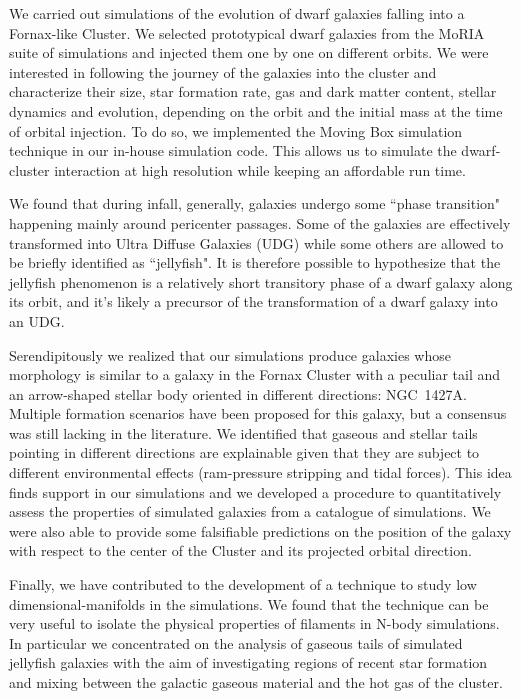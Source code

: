 We carried out simulations of the evolution of dwarf galaxies falling into a Fornax-like Cluster.
We selected prototypical dwarf galaxies from the MoRIA suite of simulations and injected them one by one on different orbits.
We were interested in following the journey of the galaxies into the cluster and characterize their size, star formation rate, gas and dark matter content, stellar dynamics and evolution, depending on the orbit and the initial mass at the time of orbital injection.
To do so, we implemented the Moving Box simulation technique in our in-house simulation code.
This allows us to simulate the dwarf-cluster interaction at high resolution while keeping an affordable run time.

We found that during infall, generally, galaxies undergo some ``phase transition" happening mainly around pericenter passages.
Some of the galaxies are effectively transformed into Ultra Diffuse Galaxies (UDG) while some others are allowed to be briefly identified as ``jellyfish".
It is therefore possible to hypothesize that the jellyfish phenomenon is a relatively short transitory phase of a dwarf galaxy along its orbit, and it's likely a precursor of the transformation of a dwarf galaxy into an UDG.

Serendipitously we realized that our simulations produce galaxies whose morphology is similar to a galaxy in the Fornax Cluster with a peculiar  \Hi{} tail and an arrow-shaped stellar body oriented in different directions: NGC~1427A.
Multiple formation scenarios have been proposed for this galaxy, but a consensus was still lacking in the literature.
We identified that gaseous and stellar tails pointing in different directions are explainable given that they are subject to different environmental effects (ram-pressure stripping and tidal forces). This idea finds support in our simulations and we developed a procedure to quantitatively assess the properties of simulated galaxies from a catalogue of simulations.
We were also able to provide some falsifiable predictions on the position of the galaxy with respect to the center of the Cluster and its projected orbital direction.

Finally, we have contributed to the development of a technique to study low dimensional-manifolds in the simulations.
We found that the technique can be very useful to isolate the physical properties of filaments in N-body simulations.
In particular we concentrated on the analysis of gaseous tails of simulated jellyfish galaxies with the aim of investigating regions of recent star formation and mixing between the galactic gaseous material and the hot gas of the cluster.


